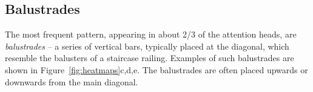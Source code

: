 \documentclass[11pt,a4paper]{article}
\newcommand\eg{e.g.\ }
\newcommand{\word}{\emph{input state}\xspace}
\newcommand{\states}{\emph{output states}\xspace}
\def\JL#1{{\color{magenta}JL: \it #1}}
\def\DEL#1{{\color{green}SMAZAT: \it #1}}
\def\JL#1{}
\def\DEL#1{}
\begin{document}
\subsection{Balustrades}

The most frequent pattern, appearing in about 2/3 of the attention heads, are \emph{balustrades} -- a series of vertical bars, typically placed at the diagonal, which resemble the balusters of a staircase railing.
Examples of such balustrades are shown in Figure~\ref{fig:heatmaps}c,d,e.
The balustrades are often placed upwards or downwards from the main diagonal.
\DEL{Sometimes they are crossing it or floating somewhere else.}


\end{document}
